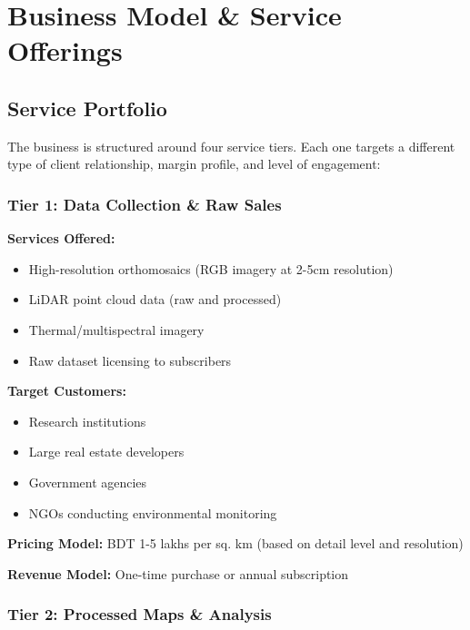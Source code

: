 
\chapter{Business Model \& Service Offerings}

\section{Service Portfolio}

The business is structured around four service tiers. Each one targets a different type of client relationship, margin profile, and level of engagement:

\subsection{Tier 1: Data Collection \& Raw Sales}

\textbf{Services Offered:}
\begin{itemize}
    \item High-resolution orthomosaics (RGB imagery at 2-5cm resolution)
    \item LiDAR point cloud data (raw and processed)
    \item Thermal/multispectral imagery
    \item Raw dataset licensing to subscribers
\end{itemize}

\textbf{Target Customers:}
\begin{itemize}
    \item Research institutions
    \item Large real estate developers
    \item Government agencies
    \item NGOs conducting environmental monitoring
\end{itemize}

\textbf{Pricing Model:} BDT 1-5 lakhs per sq. km (based on detail level and resolution)

\textbf{Revenue Model:} One-time purchase or annual subscription

\subsection{Tier 2: Processed Maps \& Analysis}

